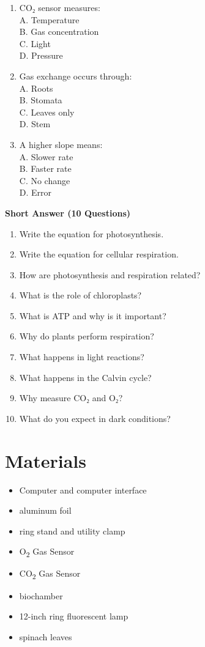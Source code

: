 \documentclass[
  letterpaper,
  DIV=11,
  numbers=noendperiod]{scrreprt}
\begin{document}
\begin{enumerate}
  D. Sugar
\item
  CO₂ sensor measures:\\
  A. Temperature\\
  B. Gas concentration\\
  C. Light\\
  D. Pressure
\item
  Gas exchange occurs through:\\
  A. Roots\\
  B. Stomata\\
  C. Leaves only\\
  D. Stem
\item
  A higher slope means:\\
  A. Slower rate\\
  B. Faster rate\\
  C. No change\\
  D. Error
\end{enumerate}

\textbf{Short Answer (10 Questions)}

\begin{enumerate}
\def\labelenumi{\arabic{enumi}.}
\item
  Write the equation for photosynthesis.
\item
  Write the equation for cellular respiration.
\item
  How are photosynthesis and respiration related?
\item
  What is the role of chloroplasts?
\item
  What is ATP and why is it important?
\item
  Why do plants perform respiration?
\item
  What happens in light reactions?
\item
  What happens in the Calvin cycle?
\item
  Why measure CO₂ and O₂?
\item
  What do you expect in dark conditions?
\end{enumerate}

\section{\texorpdfstring{\textbf{Materials}}{Materials}}\label{materials-3}

\begin{itemize}
\item
  Computer and computer interface
\item
  aluminum foil
\item
  ring stand and utility clamp
\item
  O\textsubscript{2} Gas Sensor
\item
  CO\textsubscript{2} Gas Sensor
\item
  biochamber
\item
  12-inch ring fluorescent lamp
\item
  spinach leaves
\end{itemize}
\end{document}
